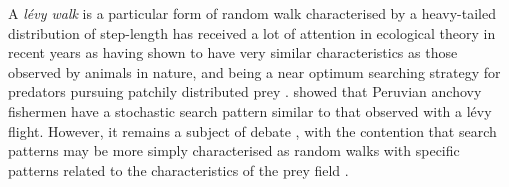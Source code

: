\documentclass[review]{elsarticle}
\begin{document}
A \textit{ {lévy walk}} is a particular form of
random walk characterised by a heavy-tailed distribution of step-length
 has received a lot of attention in
ecological theory in recent years as having shown to have very similar
characteristics as those observed by animals in nature, and being a near
optimum searching strategy for predators pursuing patchily distributed prey
\citep{Viswanathan1999, Bartumeus2005, Sims2008}.  \citet{Bertrand2007} showed
that Peruvian anchovy fishermen have a stochastic search pattern similar to
that observed with a lévy flight. However, it remains a subject of debate
, with the
contention that search patterns may be more simply characterised as random
walks \citep{Sakiyama2013} with specific patterns related to the
characteristics of the prey field \citep{Sims2012}. \\
\end{document}
